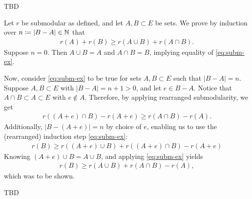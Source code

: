 \begin{aufgabe}
    TBD
\end{aufgabe}
\begin{aufgabe} \label{ex:5.2}
    Let $r$ be submodular as defined, and let $A,B \subset E$ be sets.
    We prove by induction over $n \coloneqq |B-A| \in \mathbb{N}$ that
    \begin{align}
        \label{eq:subm-ex}
        r(A)+r(B) \geq r(A\cup B) + r(A \cap B).
    \end{align}
    Suppose $n = 0$. Then $A \cup B = A$ and $A \cap B = B$, implying equality of \eqref{eq:subm-ex}.

    Now, consider \eqref{eq:subm-ex} to be true for sets $A,B \subset E$ such that $|B-A|=n$.
    Suppose $A,B \subset E$ with $|B-A|=n+1>0$, and let $e \in B-A$.
    Notice that $A \cap B \subset A \subset E$ with $e \not \in A$.
    Therefore, by applying rearranged submodularity, we get
    \begin{align}
        \label{eq:subm-ex-e}
        r( (A+e) \cap B) - r(A + e) \geq r(A \cap B) - r(A).
    \end{align}
    Additionally, $|B - (A+e)|=n$ by choice of $e$, enabling us to use
    the (rearranged) induction step \eqref{eq:subm-ex}:
    \begin{align*}
        r(B) \geq r((A+e)\cup B) + r((A+e) \cap B) - r(A+e)
    \end{align*}
    Knowing $(A+e) \cup B = A \cup B$, and applying \eqref{eq:subm-ex} yields
    \begin{align*}
        r(B) \geq r(A \cup B) + r(A \cap B) - r(A),
    \end{align*}
    which was to be shown.
\end{aufgabe}
\begin{aufgabe}
    TBD
\end{aufgabe}